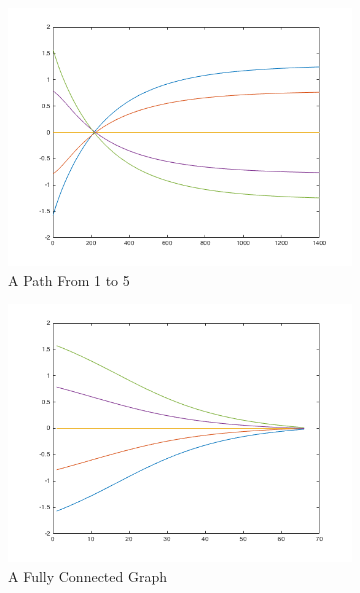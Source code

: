 \documentclass{article}
\begin{document}
\begin{figure}[h!]
\caption{Initial Values Between ($-\pi/2$ to $\pi/2$)\\Omega between
$(\pi\cdot 0.3,-\pi\cdot 0.3)$}
\centering
\begin{subfigure}[t]{0.3\textwidth}
\centering
\includegraphics[width=\textwidth]{./pi-ov2-min-om0-3.png}
\caption{A Path From 1 to 5}
\end{subfigure}
\begin{subfigure}[t]{0.3\textwidth}
\centering
\includegraphics[width=\textwidth]{pi-ov2-max-om0-3.png}
\caption{A Fully Connected Graph}
\end{subfigure}
\begin{subfigure}[t]{0.3\textwidth}

\end{subfigure}
\end{figure}
\end{document}
